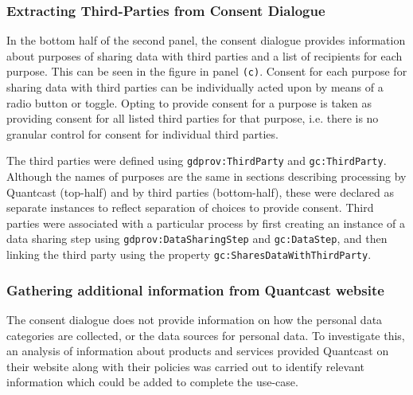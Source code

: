 \subsubsection{Extracting Third-Parties from Consent Dialogue}
In the bottom half of the second panel, the consent dialogue provides information about purposes of sharing data with third parties and a list of recipients for each purpose. This can be seen in the figure in panel \texttt{(c)}.
Consent for each purpose for sharing data with third parties can be individually acted upon by means of a radio button or toggle. Opting to provide consent for a purpose is taken as providing consent for all listed third parties for that purpose, i.e. there is no granular control for consent for individual third parties. 

The third parties were defined using \texttt{gdprov:ThirdParty} and \texttt{gc:ThirdParty}.
Although the names of purposes are the same in sections describing processing by Quantcast (top-half) and by third parties (bottom-half), these were declared as separate instances to reflect separation of choices to provide consent.
Third parties were associated with a particular process by first creating an instance of a data sharing step using \texttt{gdprov:DataSharingStep} and \texttt{gc:DataStep}, and then linking the third party using the property \texttt{gc:SharesDataWithThirdParty}.

\subsubsection{Gathering additional information from Quantcast website}
The consent dialogue does not provide information on how the personal data categories are collected, or the data sources for personal data. To investigate this, an analysis of information about products and services provided Quantcast on their website along with their policies was carried out to identify relevant information which could be added to complete the use-case.

